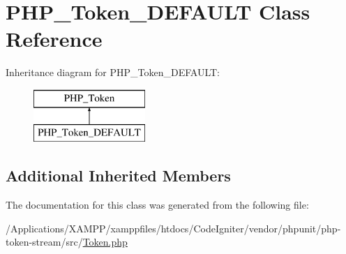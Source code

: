 \hypertarget{class_p_h_p___token___d_e_f_a_u_l_t}{}\section{P\+H\+P\+\_\+\+Token\+\_\+\+D\+E\+F\+A\+U\+LT Class Reference}
\label{class_p_h_p___token___d_e_f_a_u_l_t}
Inheritance diagram for P\+H\+P\+\_\+\+Token\+\_\+\+D\+E\+F\+A\+U\+LT\+:\begin{figure}[H]
\begin{center}
\leavevmode
\includegraphics[height=2.000000cm]{class_p_h_p___token___d_e_f_a_u_l_t}
\end{center}
\end{figure}
\subsection*{Additional Inherited Members}


The documentation for this class was generated from the following file\+:\begin{DoxyCompactItemize}
\item 
/\+Applications/\+X\+A\+M\+P\+P/xamppfiles/htdocs/\+Code\+Igniter/vendor/phpunit/php-\/token-\/stream/src/\mbox{\hyperlink{_token_8php}{Token.\+php}}\end{DoxyCompactItemize}
